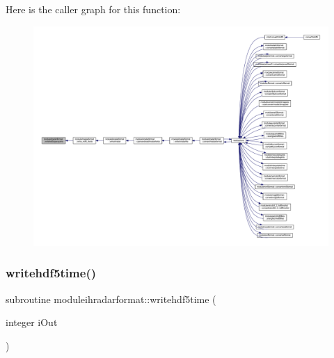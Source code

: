 Here is the caller graph for this function\+:\nopagebreak
\begin{figure}[H]
\begin{center}
\leavevmode
\includegraphics[width=350pt]{namespacemoduleihradarformat_a2599e1f0971dcb3531d9ee88d55830d8_icgraph}
\end{center}
\end{figure}
\mbox{\label{namespacemoduleihradarformat_abdd46dbddc8ccd64e7600d2abba43395}} 
\subsubsection{\texorpdfstring{writehdf5time()}{writehdf5time()}}
{\footnotesize\ttfamily subroutine moduleihradarformat\+::writehdf5time (\begin{DoxyParamCaption}\item[{integer}]{i\+Out }\end{DoxyParamCaption})\hspace{0.3cm}{\ttfamily [private]}}

